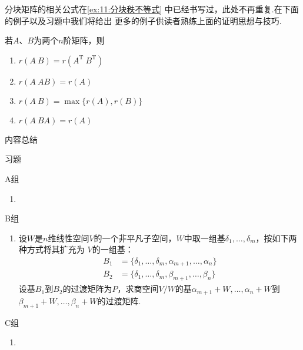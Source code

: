 分块矩阵的相关公式在\autoref{ex:11:分块秩不等式} 中已经书写过，此处不再重复.在下面的例子以及习题中我们将给出
更多的例子供读者熟练上面的证明思想与技巧.
\begin{example}
    若$A$、$B$为两个$n$阶矩阵，则
    \begin{enumerate}[label=\Alph*.]
        \item $r(A\ B)=r(A^\mathrm{T}\ B^\mathrm{T})$

        \item $r(A\ AB)=r(A)$

        \item $r(A\ B)=\max\{r(A), r(B)\}$

        \item $r(A\ BA)=r(A)$
    \end{enumerate}
\end{example}
\begin{solution}

\end{solution}

\vspace{2ex}
\centerline{\heiti \Large 内容总结}

\vspace{2ex}

\centerline{\heiti \Large 习题}
\vspace{2ex}
{\kaishu }
\begin{flushright}
    \kaishu

\end{flushright}
\centerline{\heiti A组}
\begin{enumerate}
    \item
\end{enumerate}
\centerline{\heiti B组}
\begin{enumerate}
    \item 设$W$是$n$维线性空间$V$的一个非平凡子空间，$W$中取一组基$\delta_1,\ldots,\delta_m$，按如下两种方式将其扩充为
    $V$的一组基：
    \begin{align*}
        B_1&=\{\delta_1,\ldots,\delta_m,\alpha_{m+1},\ldots,\alpha_n\} \\
        B_2&=\{\delta_1,\ldots,\delta_m,\beta_{m+1},\ldots,\beta_n\}
    \end{align*}
    设基$B_1$到$B_2$的过渡矩阵为$P$，求商空间$V/W$的基$\alpha_{m+1}+W,\ldots,\alpha_n+W$到
    $\beta_{m+1}+W,\ldots,\beta_n+W$的过渡矩阵.
\end{enumerate}
\centerline{\heiti C组}
\begin{enumerate}
    \item
\end{enumerate}

